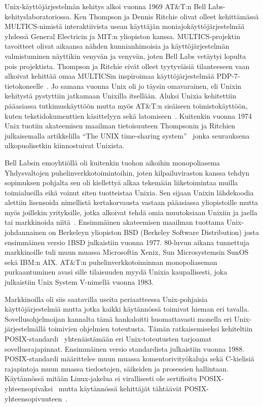Unix-käyttöjärjestelmän kehitys alkoi vuonna 1969 AT\&T:n Bell Labs-kehityslaboratoriossa.
Ken Thompson ja Dennis Ritchie olivat olleet kehittämässä MULTICS-nimistä interaktiivista usean käyttäjän moniajokäyttöjärjestelmää yhdessä General Electricin ja MIT:n yliopiston kanssa.
MULTICS-projektin tavoitteet olivat aikaansa nähden kunnianhimoisia ja käyttöjärjestelmän valmistuminen näyttikin venyvän ja venyvän, joten Bell Labs vetäytyi lopulta pois projektista.
Thompson ja Ritchie eivät olleet tyytyväisiä tilanteeseen vaan alkoivat kehittää omaa MULTICSin inspiroimaa käyttöjärjestelmää PDP-7-tietokoneelle~\cite{UnixHistoryBook}.
Jo samana vuonna Unix oli jo täysin omavarainen, eli Unixin kehitystä pystyttiin jatkamaan Unixilla itsellään.
Aluksi Unixia kehitettiin pääasiassa tutkimuskäyttöön mutta myös AT\&T:n sisäiseen toimistokäyttöön,
kuten tekstidokumenttien käsittelyyn sekä latomiseen~\cite{UnixFsBook}.
Kuitenkin vuonna 1974 Unix tuotiin akateemisen maailman tietoisuuteen Thompsonin ja Ritchien julkaisemalla artikkelilla ``The UNIX time-sharing system''~\cite{UnixPaper} jonka seurauksena ulkopuolisetkin kiinnostuivat Unixista.

Bell Labsin emoyhtiöllä oli kuitenkin tuohon aikoihin monopoliasema Yhdysvaltojen puhelinverkkotoimintoihin,
joten kilpailuviraston kanssa tehdyn sopimuksen pohjalta sen oli kiellettyä alkaa tekemään liiketoimintaa muilla toimialueilla eikä voinut siten tuotteistaa Unixia.
Sen sijaan Unixin lähdekoodia alettiin lisensoida nimellistä kertakorvausta vastaan pääasiassa yliopistoille mutta myös joillekin yrityksille,
jotka alkoivat tehdä omia muutoksiaan Unixiin ja jaella tai markkinoida niitä~\cite{UnixFsBook}.
Ensimmäinen akateemisen maailman tuottama Unix-johdannainen on Berkeleyn yliopiston BSD (Berkeley Software Distribution) josta ensimmäinen versio 1BSD julkaistiin vuonna 1977.
80-luvun aikana tunnettuja markkinoille tuli muun muassa Microsoftin Xenix, Sun Microsystemsin SunOS sekä IBM:n AIX.
AT\&T:n puhelinverkkotoiminnan monopoliaseman purkaantuminen avasi sille tilaisuuden myydä Unixia kaupallisesti,
joka julkaistiin Unix System V-nimellä vuonna 1983.

Markkinoilla oli siis saatavilla useita periaatteessa Unix-pohjaisia käyttöjärjestelmiä mutta jotka kaikki käytännössä toimivat hieman eri tavalla.
Sovellusohjelmoijan kannalta tämä hankaloitti huomattavasti monella eri Unix-järjestelmällä toimivien ohjelmien toteutusta.
Tämän ratkaisemiseksi kehiteltiin POSIX-standardi~\cite{PosixSpec} yhtenäistämään eri Unix-toteutusten tarjoamat sovellusrajapinnat.
Ensimmäinen versio standardista julkaistiin vuonna 1988.
POSIX-standardi määrittelee muun muassa komentorivityökaluja sekä C-kielisiä rajapintoja muun muassa tiedostojen, säikeiden ja prosessien hallintaan.
Käytännössä mitään Linux-jakelua ei virallisesti ole sertifioitu POSIX-yhteensopivaksi~\cite{PosixLinuxCompat}
mutta käytännössä kehittäjät tähtäävät POSIX-yhteensopivuuteen~\cite{LinuxKernelBook}.

